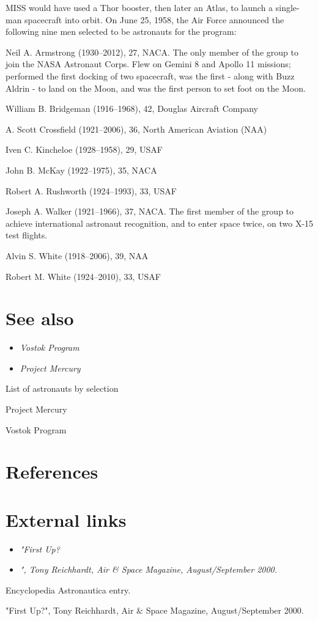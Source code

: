 MISS would have used a Thor booster, then later an Atlas, to launch a
single-man spacecraft into orbit. On June 25, 1958, the Air Force
announced the following nine men selected to be astronauts for the
program:

Neil A. Armstrong (1930--2012), 27, NACA. The only member of the group
to join the NASA Astronaut Corps. Flew on Gemini 8 and Apollo 11
missions; performed the first docking of two spacecraft, was the first -
along with Buzz Aldrin - to land on the Moon, and was the first person
to set foot on the Moon.

William B. Bridgeman (1916--1968), 42, Douglas Aircraft Company

A. Scott Crossfield (1921--2006), 36, North American Aviation (NAA)

Iven C. Kincheloe (1928--1958), 29, USAF

John B. McKay (1922--1975), 35, NACA

Robert A. Rushworth (1924--1993), 33, USAF

Joseph A. Walker (1921--1966), 37, NACA. The first member of the group
to achieve international astronaut recognition, and to enter space
twice, on two X-15 test flights.

Alvin S. White (1918--2006), 39, NAA

Robert M. White (1924--2010), 33, USAF

\section{See also}\label{see-also}

\begin{itemize}
\item
  \emph{Vostok Program}
\item
  \emph{Project Mercury}
\end{itemize}

List of astronauts by selection

Project Mercury

Vostok Program

\section{References}\label{references}

\section{External links}\label{external-links}

\begin{itemize}
\item
  \emph{"First Up?}
\item
  \emph{", Tony Reichhardt, Air \& Space Magazine, August/September
  2000.}
\end{itemize}

Encyclopedia Astronautica entry.

"First Up?", Tony Reichhardt, Air \& Space Magazine, August/September
2000.
